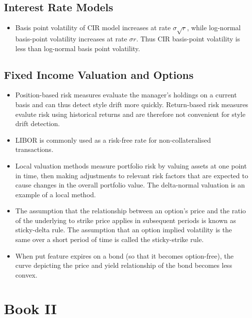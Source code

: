 \subsection{Interest Rate Models}
\begin{itemize}
	\item Basis point volatility of CIR model increases at rate $\sigma \sqrt{r}$, while log-normal basis-point volatility increases at rate $\sigma r$. Thus CIR basis-point volatility is less than log-normal basis point volatility.
\end{itemize}

\subsection{Fixed Income Valuation and Options}
\begin{itemize}
	\item Position-based risk measures evaluate the manager's holdings on a current basis and can thus detect style drift more quickly. Return-based risk measures evalute risk using historical returns and are therefore not convenient for style drift detection.
	\item LIBOR is commonly used as a risk-free rate for non-collateralised transactions.
	\item Local valuation methods measure portfolio risk by valuing assets at one point in time, then making adjustments to relevant risk factors that are expected to cause changes in the overall portfolio value. The delta-normal valuation is an example of a local method.
	\item The assumption that the relationship between an option's price and the ratio of the underlying to strike price applies in subsequent periods is known as sticky-delta rule. The assumption that an option implied volatility is the same over a short period of time is called the sticky-strike rule.
	\item When put feature expires on a bond (so that it becomes option-free), the curve depicting the price and yield relationship of the bond becomes less convex.
\end{itemize}

\section{Book II}

